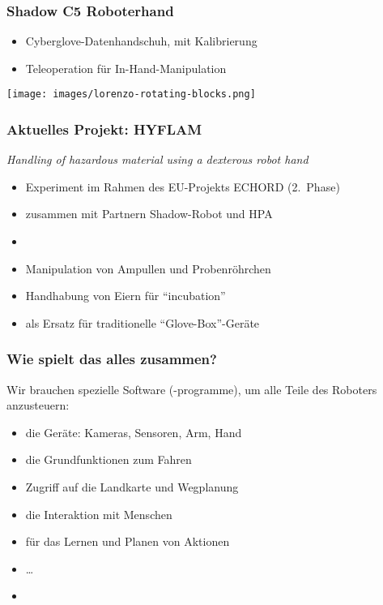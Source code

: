 \documentclass[t]{beamer}
\def\ii{\item[]}
\begin{document}
\begin{frame}
\frametitle{Shadow C5 Roboterhand}
\begin{itemize}
\item Cyberglove-Datenhandschuh, mit Kalibrierung
\item Teleoperation für In-Hand-Manipulation
\end{itemize}
\texttt{[image: images/lorenzo-rotating-blocks.png]}
\end{frame}


\begin{frame}
\frametitle{Aktuelles Projekt: HYFLAM}
{\em Handling of hazardous material using a dexterous robot hand}
\begin{itemize}
\item Experiment im Rahmen des EU-Projekts ECHORD (2.~Phase)
\item zusammen mit Partnern Shadow-Robot und HPA
\item[]
\item Manipulation von Ampullen und Probenröhrchen
\item Handhabung von Eiern für "`incubation"'
\item als Ersatz für traditionelle "`Glove-Box"'-Geräte
\end{itemize}
\end{frame}


\begin{frame}
\frametitle{Wie spielt das alles zusammen?}
Wir brauchen spezielle Software (-programme), um alle Teile
des Roboters anzusteuern:
\begin{itemize}
\item die Geräte: Kameras, Sensoren, Arm, Hand
\item die Grundfunktionen zum Fahren
\item Zugriff auf die Landkarte und Wegplanung
\item die Interaktion mit Menschen
\item für das Lernen und Planen von Aktionen
\item \dots
\ii
\end{itemize}
\end{frame}
\end{document}
